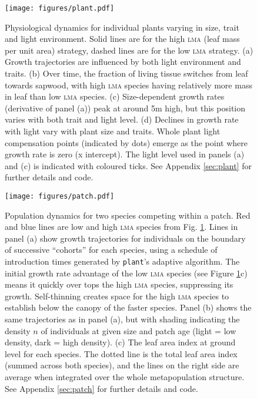 \documentclass[a4paper,11pt]{article}
\newcommand{\plant}{\texttt{plant}}
\begin{document}
\begin{figure}[h!]
\centering
\texttt{[image: figures/plant.pdf]}
\caption{Physiological dynamics for individual plants varying in size,
  trait and light environment. Solid lines are for the high
  \textsc{lma} (leaf mass per unit area) strategy, dashed lines are
  for the low \textsc{lma} strategy.  (a) Growth trajectories are
  influenced by both light environment and traits.  (b) Over time, the
  fraction of living tissue switches from leaf towards sapwood, with
  high \textsc{lma} species having relatively more mass in leaf than
  low \textsc{lma} species. (c) Size-dependent growth rates
  (derivative of panel (a)) peak at around 5m high, but this position
  varies with both trait and light level.  (d) Declines in growth rate
  with light vary with plant size and traits.  Whole plant light
  compensation points (indicated by dots) emerge as the point where
  growth rate is zero (x intercept).  The light level used in panels
  (a) and (c) is indicated with coloured ticks.  See Appendix
  \ref{sec:plant} for further details and code.}
\label{fig:plant}
\end{figure}

\newpage

\begin{figure}[h!]
\centering
\texttt{[image: figures/patch.pdf]}
\caption{Population dynamics for two species competing within a patch.
  Red and blue lines are low and high \textsc{lma} species from
  Fig. \ref{fig:plant}.  Lines in panel (a) show growth trajectories
  for individuals on the boundary of successive ``cohorts'' for each
  species, using a schedule of introduction times generated by
  {\plant}'s adaptive algorithm.  The initial growth rate advantage of
  the low \textsc{lma} species (see Figure \ref{fig:plant}c) means it
  quickly over tops the high \textsc{lma} species, suppressing its
  growth.  Self-thinning creates space for the high \textsc{lma}
  species to establish below the canopy of the faster species. Panel
  (b) shows the same trajectories as in panel (a), but with shading
  indicating the density $n$ of individuals at given size and patch
  age (light = low density, dark = high density).  (c) The leaf area
  index at ground level for each species.  The dotted line is the
  total leaf area index (summed across both species), and the lines on
  the right side are average when integrated over the whole
  metapopulation structure.  See Appendix \ref{sec:patch} for further
  details and code.}
\label{fig:patch}
\end{figure}
\end{document}
